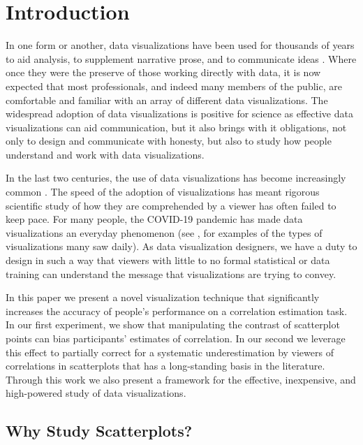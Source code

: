 \documentclass[preprint, 3p,
authoryear]{elsarticle} %
\begin{document}
\hypertarget{introduction}{%
\section{Introduction}\label{introduction}}

In one form or another, data visualizations have been used for thousands
of years to aid analysis, to supplement narrative prose, and to
communicate ideas \citep{azzam_2013}. Where once they were the preserve
of those working directly with data, it is now expected that most
professionals, and indeed many members of the public, are comfortable
and familiar with an array of different data visualizations. The
widespread adoption of data visualizations is positive for science as
effective data visualizations can aid communication, but it also brings
with it obligations, not only to design and communicate with honesty,
but also to study how people understand and work with data
visualizations.

In the last two centuries, the use of data visualizations has become
increasingly common \citep{friendly_2005, azzam_2013}. The speed of the
adoption of visualizations has meant rigorous scientific study of how
they are comprehended by a viewer has often failed to keep pace. For
many people, the COVID-19 pandemic has made data visualizations an
everyday phenomenon (see \citealp{bbc_2022}, for examples of the types
of visualizations many saw daily). As data visualization designers, we
have a duty to design in such a way that viewers with little to no
formal statistical or data training can understand the message that
visualizations are trying to convey.

In this paper we present a novel visualization technique that
significantly increases the accuracy of people's performance on a
correlation estimation task. In our first experiment, we show that
manipulating the contrast of scatterplot points can bias participants'
estimates of correlation. In our second we leverage this effect to
partially correct for a systematic underestimation by viewers of
correlations in scatterplots that has a long-standing basis in the
literature. Through this work we also present a framework for the
effective, inexpensive, and high-powered study of data visualizations.

\hypertarget{why-study-scatterplots}{%
\subsection{Why Study Scatterplots?}\label{why-study-scatterplots}}
\end{document}
